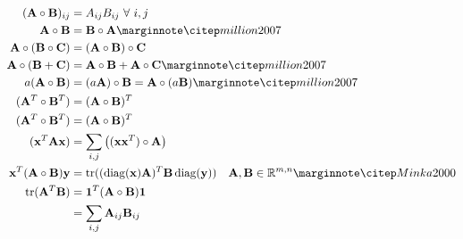 \begin{align}
(\mA\circ\mB)_{ij}    &= A_{ij}B_{ij}~\forall~i,j                                     \\
\mA\circ\mB           &= \mB\circ\mA                             \eqcite{million2007} \\
\mA\circ(\mB\circ\mC) &= (\mA\circ\mB)\circ\mC                                        \\
\mA\circ(\mB+\mC)     &= \mA\circ\mB+\mA\circ\mC                 \eqcite{million2007} \\
a(\mA\circ\mB)        &= (a\mA)\circ\mB =\mA\circ(a\mB)          \eqcite{million2007} \\
(\mA^T\circ\mB^T)     &= (\mA\circ\mB)^T                                              \\
(\mA^T\circ\mB^T)     &= (\mA\circ\mB)^T                                              \\
(\vx^T \mA \vx)       &= \sum_{i,j}\big((\vx \vx^T)\circ\mA\big)                      \\
\vx^T(\mA\circ\mB)\vy &= \trace((\diag(\vx)\mA)^T \mB\diag(\vy))~~~\mA,\mB\in\sRmn \eqcite{Minka2000}   \\
\trace(\mA^T\mB)      &= \mathbf{1}^T(\mA\circ\mB)\mathbf{1}                          \\
                      &= \sum_{i,j} \mA_{ij}\mB_{ij}
\end{align}
